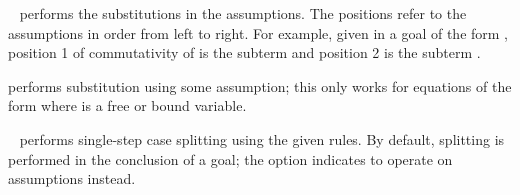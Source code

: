 \begin{isabellebody}
\begin{isamarkuptext}
\begin{description}
  \item \hyperlink{method.subst}{\mbox{}}~ performs the
  substitutions in the assumptions. The positions refer to the
  assumptions in order from left to right.  For example, given in a
  goal of the form , position 1 of
  commutativity of  is the subterm  and
  position 2 is the subterm .

  \item \hyperlink{method.hypsubst}{\mbox{}} performs substitution using some
  assumption; this only works for equations of the form  where  is a free or bound variable.

  \item \hyperlink{method.split}{\mbox{}}~ performs single-step case
  splitting using the given rules.  By default, splitting is performed
  in the conclusion of a goal; the  option indicates to
  operate on assumptions instead.
  

\end{description}
\end{isamarkuptext}
\end{isabellebody}
